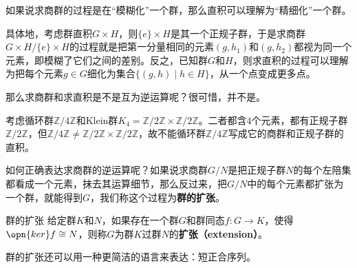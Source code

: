 


如果说求商群的过程是在“模糊化”一个群，那么直积可以理解为“精细化”一个群。

具体地，考虑群直积$G\times H$，则$\{e\}\times H$是其一个正规子群，于是求商群$G\times H/\{e\}\times H$的过程就是把第一分量相同的元素$(g, h_1)$和$(g, h_2)$都视为同一个元素，即模糊了它们之间的差别。反之，已知群$G$和$H$，则求直积的过程可以理解为把每个元素$g\in G$细化为集合$\{(g, h)\mid h\in H\}$，从一个点变成更多点。


那么求商群和求直积是不是互为逆运算呢？很可惜，并不是。



\begin{example}{}
考虑循环群$\mathbb{Z}/4\mathbb{Z}$和Klein群$K_4=\mathbb{Z}/2\mathbb{Z}\times \mathbb{Z}/2\mathbb{Z}$。二者都含$4$个元素，都有正规子群$\mathbb{Z}/2\mathbb{Z}$，但$\mathbb{Z}/4\mathbb{Z}\neq \mathbb{Z}/2\mathbb{Z}\times \mathbb{Z}/2\mathbb{Z}$，故不能循环群$\mathbb{Z}/4\mathbb{Z}$写成它的商群和正规子群的直积。
\end{example}




如何正确表达求商群的逆运算呢？如果说求商群$G/N$是把正规子群$N$的每个左陪集都看成一个元素，抹去其运算细节，那么反过来，把$G/N$中的每个元素都扩张为一个群，就能得到$G$，我们称这个过程为\textbf{群的扩张}。



\begin{definition}{群的扩张}\label{def_GrpExt_1}
给定群$K$和$N$，如果存在一个群$G$和群同态$f:G\to K$，使得$\opn{ker}f\cong N$，则称$G$为群$K$过群$N$的\textbf{扩张（extension）}。
\end{definition}




群的扩张还可以用一种更简洁的语言来表达：短正合序列。



